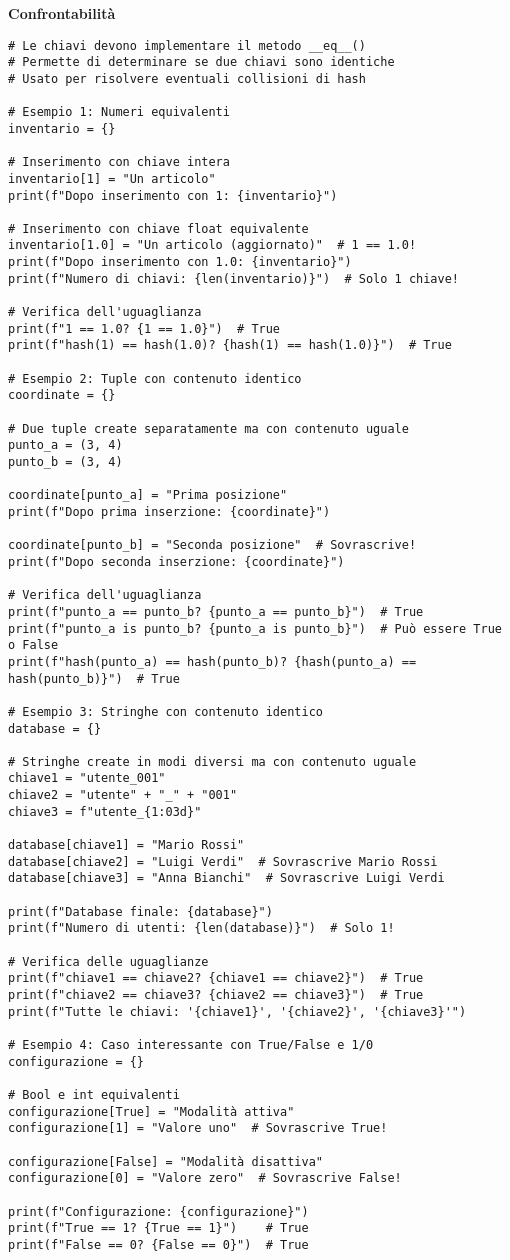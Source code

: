 \vspace{0.5cm}
\textbf{Confrontabilità}
\begin{lstlisting}
# Le chiavi devono implementare il metodo __eq__()
# Permette di determinare se due chiavi sono identiche
# Usato per risolvere eventuali collisioni di hash

# Esempio 1: Numeri equivalenti
inventario = {}

# Inserimento con chiave intera
inventario[1] = "Un articolo"
print(f"Dopo inserimento con 1: {inventario}")

# Inserimento con chiave float equivalente
inventario[1.0] = "Un articolo (aggiornato)"  # 1 == 1.0!
print(f"Dopo inserimento con 1.0: {inventario}")
print(f"Numero di chiavi: {len(inventario)}")  # Solo 1 chiave!

# Verifica dell'uguaglianza
print(f"1 == 1.0? {1 == 1.0}")  # True
print(f"hash(1) == hash(1.0)? {hash(1) == hash(1.0)}")  # True

# Esempio 2: Tuple con contenuto identico
coordinate = {}

# Due tuple create separatamente ma con contenuto uguale
punto_a = (3, 4)
punto_b = (3, 4)

coordinate[punto_a] = "Prima posizione"
print(f"Dopo prima inserzione: {coordinate}")

coordinate[punto_b] = "Seconda posizione"  # Sovrascrive!
print(f"Dopo seconda inserzione: {coordinate}")

# Verifica dell'uguaglianza
print(f"punto_a == punto_b? {punto_a == punto_b}")  # True
print(f"punto_a is punto_b? {punto_a is punto_b}")  # Può essere True o False
print(f"hash(punto_a) == hash(punto_b)? {hash(punto_a) == hash(punto_b)}")  # True

# Esempio 3: Stringhe con contenuto identico
database = {}

# Stringhe create in modi diversi ma con contenuto uguale
chiave1 = "utente_001"
chiave2 = "utente" + "_" + "001"
chiave3 = f"utente_{1:03d}"

database[chiave1] = "Mario Rossi"
database[chiave2] = "Luigi Verdi"  # Sovrascrive Mario Rossi
database[chiave3] = "Anna Bianchi"  # Sovrascrive Luigi Verdi

print(f"Database finale: {database}")
print(f"Numero di utenti: {len(database)}")  # Solo 1!

# Verifica delle uguaglianze
print(f"chiave1 == chiave2? {chiave1 == chiave2}")  # True
print(f"chiave2 == chiave3? {chiave2 == chiave3}")  # True
print(f"Tutte le chiavi: '{chiave1}', '{chiave2}', '{chiave3}'")

# Esempio 4: Caso interessante con True/False e 1/0
configurazione = {}

# Bool e int equivalenti
configurazione[True] = "Modalità attiva"
configurazione[1] = "Valore uno"  # Sovrascrive True!

configurazione[False] = "Modalità disattiva" 
configurazione[0] = "Valore zero"  # Sovrascrive False!

print(f"Configurazione: {configurazione}")
print(f"True == 1? {True == 1}")    # True
print(f"False == 0? {False == 0}")  # True
\end{lstlisting}

